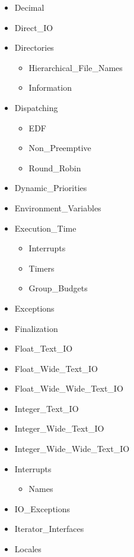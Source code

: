 \documentclass[english]{article}
\begin{document}
\begin{scriptsize}
\begin{multicols*}{5}
\begin{itemize}[leftmargin=0mm]
\begin{itemize}[leftmargin=5mm]
\begin{itemize}[leftmargin=5mm]
         \end{itemize}
      \item[] Decimal
      \item[] Direct\_IO
      \item[] Directories
         \begin{itemize}[leftmargin=15mm]
            \item[] Hierarchical\_File\_Names
            \item[] Information
         \end{itemize}
      \item[] Dispatching
         \begin{itemize}[leftmargin=15mm]
            \item[] EDF
            \item[] Non\_Preemptive
            \item[] Round\_Robin
         \end{itemize}
      \item[] Dynamic\_Priorities
      \item[] Environment\_Variables
      \item[] Execution\_Time
         \begin{itemize}[leftmargin=15mm]
            \item[] Interrupts
            \item[] Timers
            \item[] Group\_Budgets
         \end{itemize}
      \item[] Exceptions
      \item[] Finalization
      \item[] Float\_Text\_IO
      \item[] Float\_Wide\_Text\_IO
      \item[] Float\_Wide\_Wide\_Text\_IO
      \item[] Integer\_Text\_IO
      \item[] Integer\_Wide\_Text\_IO
      \item[] Integer\_Wide\_Wide\_Text\_IO
      \item[] Interrupts
         \begin{itemize}[leftmargin=15mm]
            \item[] Names
         \end{itemize}
      \item[] IO\_Exceptions
      \item[] Iterator\_Interfaces
      \item[] Locales

\end{itemize}
\end{itemize}
\end{multicols*}
\end{scriptsize}
\end{document}
